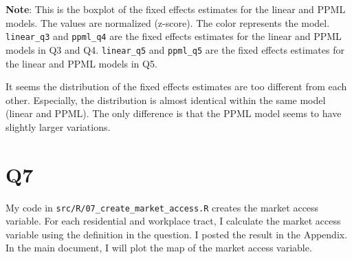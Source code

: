 \documentclass[
  11pt]{article}
\begin{document}
\footnotesize \textbf{Note}: This is the boxplot of the fixed effects
estimates for the linear and PPML models. The values are normalized
(z-score). The color represents the model. \texttt{linear\_q3} and
\texttt{ppml\_q4} are the fixed effects estimates for the linear and
PPML models in Q3 and Q4. \texttt{linear\_q5} and \texttt{ppml\_q5} are
the fixed effects estimates for the linear and PPML models in
Q5.\vspace{2em}

\normalsize

It seems the distribution of the fixed effects estimates are too
different from each other. Especially, the distribution is almost
identical within the same model (linear and PPML). The only difference
is that the PPML model seems to have slightly larger variations.

\clearpage

\section*{Q7}\label{q7}

My code in \texttt{src/R/07\_create\_market\_access.R} creates the
market access variable. For each residential and workplace tract, I
calculate the market access variable using the definition in the
question. I posted the result in the Appendix. In the main document, I
will plot the map of the market access variable.
\end{document}
